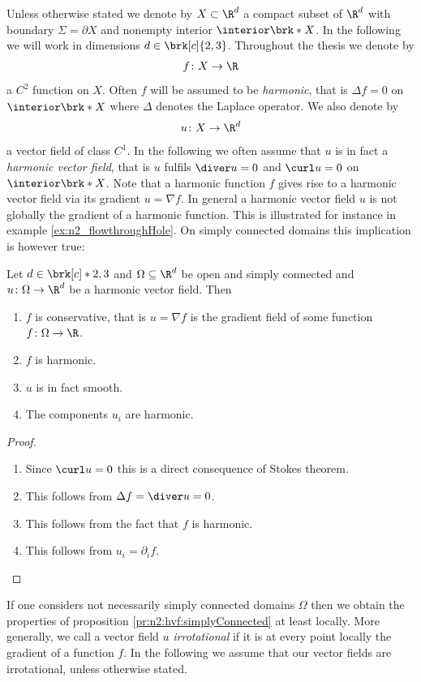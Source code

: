 Unless otherwise stated we denote by $X\subset\R^d$ a compact subset of $\R^d$ with boundary $\Sigma=\partial X$ and nonempty interior
$\openX$.
In the following we will work in dimensions $d\in\brk[c]{2,3}$.
Throughout the thesis we denote by
\begin{align*}
  f\colon X\to\R
\end{align*}
a $C^2$ function on $X$. Often $f$ will be assumed to be \emph{harmonic},
that is $\Delta f=0$ on $\openX$ where $\Delta$ denotes the Laplace operator.
We also denote by
\begin{align*}
  u\colon X\to\R^d
\end{align*}
a vector field of class $C^1$.
In the following we often assume that $u$ is in fact a \emph{harmonic vector field}, that is $u$ fulfils
$\diver u=0$ and $\curl u=0$ on $\openX$.
Note that a harmonic function $f$ gives rise to a harmonic vector field via its gradient $u=\nabla f$.
In general a harmonic vector field $u$ is not globally the gradient of a harmonic function.
This is illustrated for instance in example \ref{ex:n2_flowthroughHole}.
On simply connected domains this implication is however true:
\begin{proposition}\label{pr:n2:hvf:simplyConnected}
  Let $d\in\brk[c]*{2,3}$ and $\Omega\subseteq\R^d$ be open and simply connected and $u\colon\Omega\to\R^d$ be a harmonic vector field. Then
  \begin{enumerate}
    \item $f$ is conservative, that is
    $u=\nabla f$ is the gradient field of some
    function $f\colon\Omega\to\R$.
    \item $f$ is harmonic.
    \item $u$ is in fact smooth.
    \item The components $u_i$ are harmonic.
  \end{enumerate}
\end{proposition}
\begin{proof}
  \begin{enumerate}
    \item 
    Since $\curl u =0$ this is a direct consequence of Stokes theorem.
    \item This follows from $\Delta f = \diver u=0$.
    \item This follows from the fact that $f$ is harmonic.
    \item This follows from $u_i=\partial_if$.\qedhere
  \end{enumerate}
\end{proof}
If one considers not necessarily simply connected domains $\Omega$ then we obtain the
properties of proposition \ref{pr:n2:hvf:simplyConnected} at least locally.
More generally, we call a vector field $u$ \emph{irrotational} if it is at every point locally the gradient of a function $f$.
In the following we assume that our vector fields are irrotational, unless otherwise stated.


